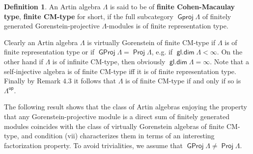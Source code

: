 \documentclass[oneside, a4paper,reqno]{amsart}
\numberwithin{equation}{section}
\theoremstyle{definition}
\newtheorem{defn}[thm]{Definition}
\begin{document}
\begin{defn} An Artin algebra $\Lambda$ is said to be of {\bf finite Cohen-Macaulay
type}, {\bf finite CM-type} for short, if the full subcategory
${\operatorname{\mathsf{Gproj}}\nolimits}\Lambda$ of finitely generated Gorenstein-projective
$\Lambda$-modules is of finite representation type.
\end{defn}

Clearly an Artin algebra $\Lambda$ is virtually Gorenstein of
finite CM-type if $\Lambda$ is of finite representation type or if
${\operatorname{\mathsf{GProj}}\nolimits}\Lambda = \operatorname*{\mathsf{Proj}}\Lambda$, e.g. if $\operatorname*{\mathsf{gl.dim}}\Lambda < \infty$. On
the other hand if $\Lambda$ is of infinite CM-type, then obviously
$\operatorname*{\mathsf{gl.dim}}\Lambda = \infty$. Note that a self-injective algebra is of finite
CM-type iff it is of finite representation type. Finally by Remark $4.3$ it follows that $\Lambda$ is of finite
CM-type if and only if so is $\Lambda^\operatorname*{\mathsf{op}}$.

The following result shows that the class of Artin algebras enjoying
the property that any Gorenstein-projective module is a direct sum
of finitely generated modules coincides with the class of virtually
Gorenstein algebras of finite CM-type, and condition (vii)
characterizes them in terms of an interesting factorization
property.
 To avoid trivialities, we assume that
${\operatorname{\mathsf{GProj}}\nolimits}\Lambda \neq \operatorname*{\mathsf{Proj}}\Lambda$.
\end{document}
